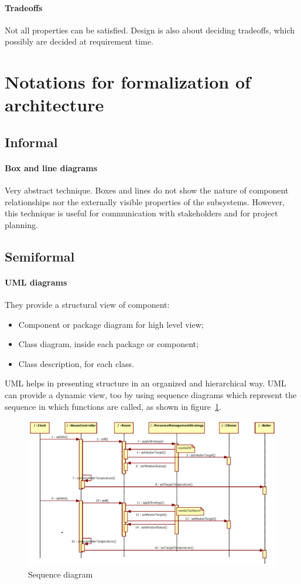 \paragraph{Tradeoffs}
Not all properties can be satisfied. Design is also about deciding tradeoffs, which possibly are decided at requirement time.

\section{Notations for formalization of architecture}
\subsection{Informal}
\paragraph{Box and line diagrams}
Very abstract technique. Boxes and lines do not  show the nature of component relationships nor the externally visible properties of the subsystems. However, this technique is useful for communication with stakeholders and for project planning.

\subsection{Semiformal}
\paragraph{UML diagrams}
They provide a structural view of component:
\begin{itemize}
\item Component or package diagram for high level view;
\item Class diagram, inside each package or component;
\item Class description, for each class.
\end{itemize}
UML helps in presenting structure in an organized and hierarchical way. UML can provide a dynamic view, too by using sequence diagrams which represent the sequence in which functions are called, as shown in figure~\ref{sequence_diagram}.

\begin{figure}[hbtp]
\centering
\includegraphics[scale=0.4]{images/uml_sequence_diagram.png}
\caption{Sequence diagram}
\label{sequence_diagram}
\end{figure}

